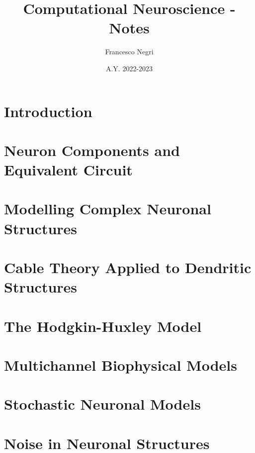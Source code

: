 \documentclass[12pt]{article}
\title{Computational Neuroscience - Notes}
\author{Francesco Negri}
\date{A.Y. 2022-2023}
\begin{document}
\maketitle

\tableofcontents
\newpage

\section{Introduction}
\graphicspath{ {./images/01/} }

\newpage

\section{Neuron Components and Equivalent Circuit}
\graphicspath{ {./images/02/} }

\newpage

\section{Modelling Complex Neuronal Structures}
\graphicspath{ {./images/03/} }

\newpage

\section{Cable Theory Applied to Dendritic Structures}
\graphicspath{ {./images/04/} }

\newpage

\section{The Hodgkin-Huxley Model}
\graphicspath{ {./images/05/} }

\newpage

\section{Multichannel Biophysical Models}
\graphicspath{ {./images/06/} }

\newpage

\section{Stochastic Neuronal Models}
\graphicspath{ {./images/07/} }

\newpage

\section{Noise in Neuronal Structures}
\graphicspath{ {./images/08/} }

\newpage
\end{document}
